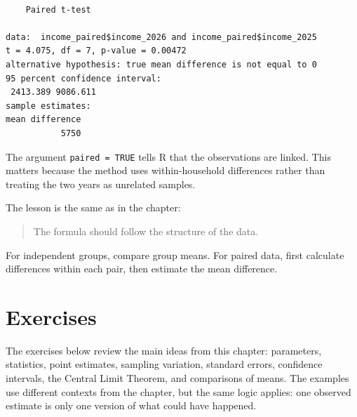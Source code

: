 \documentclass[
  letterpaper,
  DIV=11,
  numbers=noendperiod]{scrreprt}
\begin{document}
\begin{verbatim}

    Paired t-test

data:  income_paired$income_2026 and income_paired$income_2025
t = 4.075, df = 7, p-value = 0.00472
alternative hypothesis: true mean difference is not equal to 0
95 percent confidence interval:
 2413.389 9086.611
sample estimates:
mean difference 
           5750 
\end{verbatim}

The argument \texttt{paired\ =\ TRUE} tells R that the observations are
linked. This matters because the method uses within-household
differences rather than treating the two years as unrelated samples.

The lesson is the same as in the chapter:

\begin{quote}
The formula should follow the structure of the data.
\end{quote}

For independent groups, compare group means. For paired data, first
calculate differences within each pair, then estimate the mean
difference.

\section{Exercises}\label{exercises-3}

The exercises below review the main ideas from this chapter: parameters,
statistics, point estimates, sampling variation, standard errors,
confidence intervals, the Central Limit Theorem, and comparisons of
means. The examples use different contexts from the chapter, but the
same logic applies: one observed estimate is only one version of what
could have happened.
\end{document}
